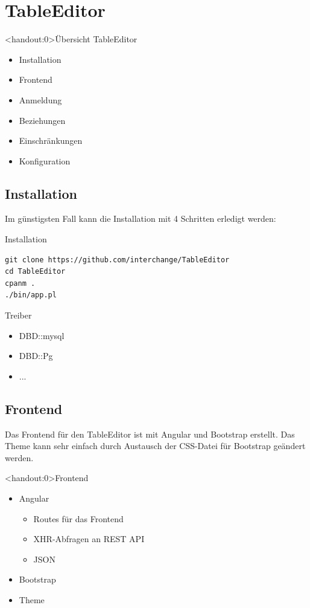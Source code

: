 \section{TableEditor}

\begin{frame}<handout:0>{Übersicht TableEditor}
\begin{itemize}
\item Installation
\item Frontend
\item Anmeldung
\item Beziehungen
\item Einschränkungen
\item Konfiguration
\end{itemize}
\end{frame}

\subsection{Installation}
Im günstigsten Fall kann die Installation mit 4 Schritten
erledigt werden:

\begin{frame}[fragile]{Installation}
\begin{lstlisting}
git clone https://github.com/interchange/TableEditor
cd TableEditor
cpanm .
./bin/app.pl
\end{lstlisting}
\end{frame}

\begin{frame}[fragile]{Treiber}
\begin{itemize}
\item DBD::mysql
\item DBD::Pg
\item ...
\end{itemize}
\end{frame}

\subsection{Frontend}
Das Frontend für den TableEditor ist mit Angular und Bootstrap erstellt.
Das Theme kann sehr einfach durch Austausch der CSS-Datei für Bootstrap
geändert werden.

\begin{frame}<handout:0>{Frontend}
\begin{itemize}
\item Angular
\begin{itemize}
\item Routes für das Frontend
\item XHR-Abfragen an REST API
\item JSON
\end{itemize}
\item Bootstrap
\item Theme
\end{itemize}
\end{frame}

